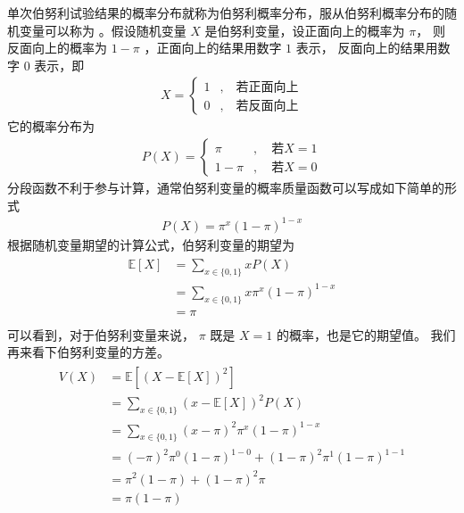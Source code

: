 \documentclass[letterpaper,10pt,english]{sphinxmanual}
\begin{document}
单次伯努利试验结果的概率分布就称为伯努利概率分布，服从伯努利概率分布的随机变量可以称为 
。假设随机变量 \(X\) 是伯努利变量，设正面向上的概率为 \(\pi\)，
则反面向上的概率为 \(1-\pi\) ，正面向上的结果用数字 \(1\) 表示，
反面向上的结果用数字 \(0\) 表示，即
\begin{equation}\label{equation:概率基础/content:概率基础/content:54}
\begin{split}X = \left \{
    \begin{aligned}
    1 &, \quad \text{若正面向上} \\
    0 &, \quad \text{若反面向上}
    \end{aligned}
    \right.\end{split}
\end{equation}
它的概率分布为
\begin{equation}\label{equation:概率基础/content:概率基础/content:55}
\begin{split}P(X) = \left \{
    \begin{aligned}
    \pi &, \quad \text{若}X=1 \\
    1-\pi &, \quad \text{若}X=0
    \end{aligned}
    \right.\end{split}
\end{equation}
分段函数不利于参与计算，通常伯努利变量的概率质量函数可以写成如下简单的形式
\begin{equation}\label{equation:概率基础/content:概率基础/content:56}
\begin{split}P(X) = \pi^x (1-\pi)^{1-x}\end{split}
\end{equation}
根据随机变量期望的计算公式，伯努利变量的期望为
\begin{align}\label{equation:概率基础/content:概率基础/content:57}\!\begin{aligned}
\mathbb{E}[X] &= \sum_{x\in \{0,1\}} x P(X)\\
&= \sum_{x\in \{0,1\}} x  \pi^x (1-\pi)^{1-x}\\
&= \pi\\
\end{aligned}\end{align}
可以看到，对于伯努利变量来说， \(\pi\) 既是 \(X=1\) 的概率，也是它的期望值。
我们再来看下伯努利变量的方差。
\begin{align}\label{equation:概率基础/content:概率基础/content:58}\!\begin{aligned}
V(X) &= \mathbb{E}[(X-\mathbb{E}[X])^2]\\
&= \sum_{x\in \{0,1\}} (x-\mathbb{E}[X])^2 P(X)\\
&= \sum_{x\in \{0,1\}} (x-\pi)^2 \pi^x (1-\pi)^{1-x}\\
&= (-\pi)^2 \pi^0 (1-\pi)^{1-0} + (1-\pi)^2 \pi^1 (1-\pi)^{1-1}\\
&= \pi^2 (1-\pi) + (1-\pi)^2 \pi\\
&= \pi (1-\pi)\\
\end{aligned}\end{align}
\end{document}
